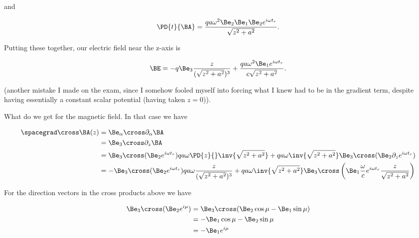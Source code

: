 and

\begin{equation}\label{eqn:relativisticElectrodynamicsExamReflection:210}
\PD{t}{\BA} =
\frac{q a \omega^2 \Be_2 \Be_1 \Be_2 e^{i \omega t_r} }{\sqrt{z^2 + a^2}}.
\end{equation}

Putting these together, our electric field near the z-axis is

\begin{equation}\label{eqn:relativisticElectrodynamicsExamReflection:230}
\BE = 
-q \Be_3 \frac{z}{(\sqrt{z^2 + a^2})^3}
+
\frac{q a \omega^2 \Be_1 e^{i \omega t_r} }{c \sqrt{z^2 + a^2}}.
\end{equation}

(another mistake I made on the exam, since I somehow fooled myself into forcing what I knew had to be in the gradient term, despite having essentially a constant scalar potential (having taken $z = 0$)).

What do we get for the magnetic field.  In that case we have

\begin{align*}
\spacegrad \cross \BA(z)
&=
\Be_\alpha \cross \partial_\alpha \BA \\
&=
\Be_3 \cross \partial_z \BA \\
&=
\Be_3 \cross (\Be_2 e^{i \omega t_r} ) q a \omega \PD{z}{} \inv{\sqrt{z^2 + a^2}} 
+
q a \omega \inv{\sqrt{z^2 + a^2}} \Be_3 \cross (\Be_2 \partial_z e^{i \omega t_r} ) \\
&=
-\Be_3 \cross (\Be_2 e^{i \omega t_r} ) q a \omega \frac{z}{(\sqrt{z^2 + a^2})^3} 
+
q a \omega \inv{\sqrt{z^2 + a^2}} \Be_3 \cross \left( \Be_1 \frac{\omega}{c} e^{i \omega t_r} \frac{z}{\sqrt{z^2 + a^2} } \right)
\end{align*}


For the direction vectors in the cross products above we have

\begin{align*}
\Be_3 \cross (\Be_2 e^{i \mu})
&=
\Be_3 \cross (\Be_2 \cos\mu - \Be_1 \sin\mu) \\
&=
-\Be_1 \cos\mu - \Be_2 \sin\mu \\
&=
-\Be_1 e^{i \mu}
\end{align*}

